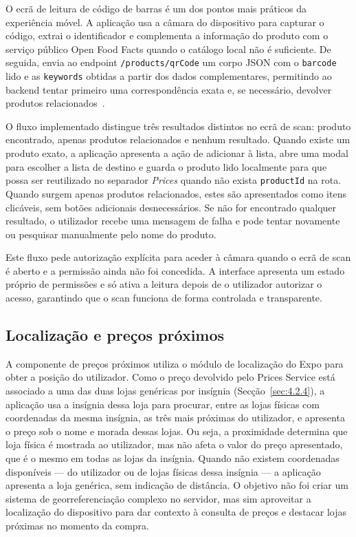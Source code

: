 O ecrã de leitura de código de barras é um dos pontos mais práticos da experiência móvel. A aplicação usa a câmara do dispositivo para capturar o código, extrai o identificador e complementa a informação do produto com o serviço público Open Food Facts quando o catálogo local não é suficiente. De seguida, envia ao endpoint \texttt{/products/qrCode} um corpo \ac{JSON} com o \texttt{barcode} lido e as \texttt{keywords} obtidas a partir dos dados complementares, permitindo ao backend tentar primeiro uma correspondência exata e, se necessário, devolver produtos relacionados~\cite{gs1-ean-upc,openfoodfacts-api}.

O fluxo implementado distingue três resultados distintos no ecrã de scan: produto encontrado, apenas produtos relacionados e nenhum resultado. Quando existe um produto exato, a aplicação apresenta a ação de adicionar à lista, abre uma modal para escolher a lista de destino e guarda o produto lido localmente para que possa ser reutilizado no separador \textit{Prices} quando não exista \texttt{productId} na rota. Quando surgem apenas produtos relacionados, estes são apresentados como itens clicáveis, sem botões adicionais desnecessários. Se não for encontrado qualquer resultado, o utilizador recebe uma mensagem de falha e pode tentar novamente ou pesquisar manualmente pelo nome do produto.

Este fluxo pede autorização explícita para aceder à câmara quando o ecrã de scan é aberto e a permissão ainda não foi concedida. A interface apresenta um estado próprio de permissões e só ativa a leitura depois de o utilizador autorizar o acesso, garantindo que o scan funciona de forma controlada e transparente.

\subsection{Localização e preços próximos}
\label{sec:4.6.2}

A componente de preços próximos utiliza o módulo de localização do Expo para obter a posição do utilizador. Como o preço devolvido pelo Prices Service está associado a uma das duas lojas genéricas por insígnia (Secção~\ref{sec:4.2.4}), a aplicação usa a insígnia dessa loja para procurar, entre as lojas físicas com coordenadas da mesma insígnia, as três mais próximas do utilizador, e apresenta o preço sob o nome e morada dessas lojas. Ou seja, a proximidade determina que loja física é mostrada ao utilizador, mas não afeta o valor do preço apresentado, que é o mesmo em todas as lojas da insígnia. Quando não existem coordenadas disponíveis — do utilizador ou de lojas físicas dessa insígnia — a aplicação apresenta a loja genérica, sem indicação de distância. O objetivo não foi criar um sistema de georreferenciação complexo no servidor, mas sim aproveitar a localização do dispositivo para dar contexto à consulta de preços e destacar lojas próximas no momento da compra.

